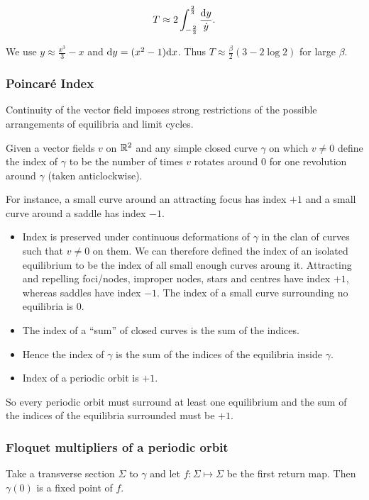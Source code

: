 \documentclass{notes}
\theoremstyle{plain}
\begin{document}
\[
T \approx 2 \int_{-\frac{2}{3}}^{\frac{2}{3}} \frac{\mathrm{d} y}{\dot{y}}.
\]

We use $y \approx \frac{x^3}{3} - x$ and $\mathrm{d} y = (x^2 - 1) \mathrm{d} x$.  Thus
$T \approx \frac{\beta}{2}\left( 3 - 2 \log 2\right)$ for large $\beta$.

\subsubsection*{Poincar\'e Index}

Continuity of the vector field imposes strong restrictions of the possible
arrangements of equilibria and limit cycles.

Given a vector fields $v$ on $\mathbb{R}^2$ and any simple closed curve $\gamma$
on which $v \neq 0$ define the index of $\gamma$ to be the number of times
$v$ rotates around $0$ for one revolution around $\gamma$ (taken
anticlockwise).

For instance, a small curve around an attracting focus has index $+1$ and
a small curve around a saddle has index $-1$.

\vspace{1in}

\begin{itemize}
\item Index is preserved under continuous deformations of $\gamma$ in
the clan of curves such that $v \neq 0$ on them.  We can therefore defined
the index of an isolated equilibrium to be the index of all small enough
curves aroung it.  Attracting and repelling foci/nodes, improper nodes,
stars and centres have index $+1$, whereas saddles have index $-1$.  The
index of a small curve surrounding no equilibria is $0$.
\item The index of a ``sum'' of closed curves is the sum of the indices.
\item Hence the index of $\gamma$ is the sum of the indices of the equilibria
inside $\gamma$.
\item Index of a periodic orbit is $+1$.
\end{itemize}

So every periodic orbit must surround at least one equilibrium and the
sum of the indices of the equilibria surrounded must be $+1$.

\subsubsection*{Floquet multipliers of a periodic orbit}

Take a transverse section $\Sigma$ to $\gamma$ and let $f \colon \Sigma
\mapsto \Sigma$ be the first return map.  Then $\gamma(0)$ is a fixed
point of $f$.
\end{document}
